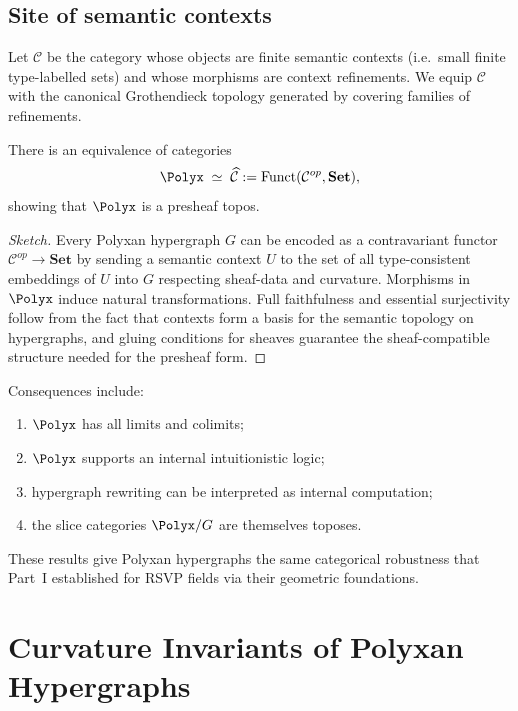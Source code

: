 \subsection{Site of semantic contexts}

Let $\mathcal{C}$ be the category whose objects are finite semantic contexts
(i.e.\ small finite type-labelled sets) and whose morphisms are context
refinements.  We equip $\mathcal{C}$ with the canonical Grothendieck topology
generated by covering families of refinements.

\begin{theorem}
\label{thm:polyx-topos}
There is an equivalence of categories
\[
\Polyx \;\simeq\; \widehat{\mathcal{C}}
:= \mathrm{Funct}(\mathcal{C}^{op},\mathbf{Set}),
\]
showing that $\Polyx$ is a presheaf topos.
\end{theorem}

\begin{proof}[Sketch]
Every Polyxan hypergraph $G$ can be encoded as a contravariant functor
$\mathcal{C}^{op}\to\mathbf{Set}$ by sending a semantic context $U$ to the set
of all type-consistent embeddings of $U$ into $G$ respecting sheaf-data and
curvature.  Morphisms in $\Polyx$ induce natural transformations.  Full
faithfulness and essential surjectivity follow from the fact that contexts form
a basis for the semantic topology on hypergraphs, and gluing conditions for
sheaves guarantee the sheaf-compatible structure needed for the presheaf
form.
\end{proof}

Consequences include:

\begin{enumerate}
  \item $\Polyx$ has all limits and colimits;
  \item $\Polyx$ supports an internal intuitionistic logic;
  \item hypergraph rewriting can be interpreted as internal computation;
  \item the slice categories $\Polyx/G$ are themselves toposes.
\end{enumerate}

These results give Polyxan hypergraphs the same categorical robustness that
Part~I established for RSVP fields via their geometric foundations.

\section{Curvature Invariants of Polyxan Hypergraphs}


